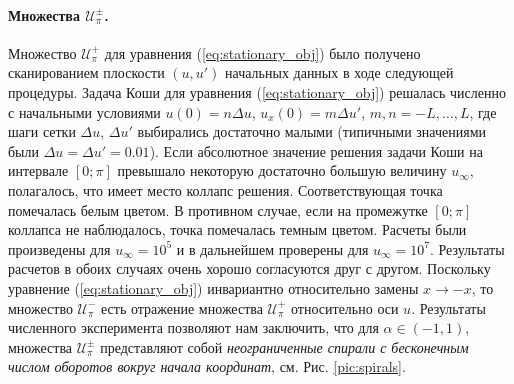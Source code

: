 \paragraph{Множества $\mathcal{U}_{\pi}^{\pm}$.}
Множество $\mathcal{U}_{\pi}^+$ для уравнения (\ref{eq:stationary_obj}) было получено сканированием плоскости $(u,u')$ начальных данных в ходе следующей процедуры.
Задача Коши для уравнения (\ref{eq:stationary_obj}) решалась численно с начальными условиями $u(0) = n \Delta u$, $u_x(0) = m \Delta u'$, $m, n = -L, \dots, L$, где шаги сетки $\Delta u$, $\Delta u'$ выбирались достаточно малыми (типичными значениями были $\Delta u = \Delta u' = 0.01$).
Если абсолютное значение решения задачи Коши на интервале $[0; \pi]$ превышало некоторую достаточно большую величину $u_\infty$, полагалось, что имеет место коллапс решения.
Соответствующая точка помечалась белым цветом.
В противном случае, если на промежутке $[0; \pi]$ коллапса не наблюдалось, точка помечалась темным цветом.
Расчеты были произведены для $u_\infty = 10^5$ и в дальнейшем проверены для $u_\infty = 10^7$.
Результаты расчетов в обоих случаях очень хорошо согласуются друг с другом.
Поскольку уравнение (\ref{eq:stationary_obj}) инвариантно относительно замены $x \to -x$, то множество $\mathcal{U}_{\pi}^-$ есть отражение множества $\mathcal{U}_{\pi}^+$ относительно оси $u$.
Результаты численного эксперимента позволяют нам заключить, что для $\alpha \in (-1, 1)$, множества $\mathcal{U}_{\pi}^{\pm}$ представляют собой {\it неограниченные спирали с бесконечным числом оборотов вокруг начала координат}, см. Рис. \ref{pic:spirals}.
%
